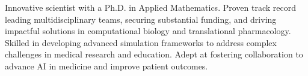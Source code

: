 \par{
Innovative scientist with a Ph.D. in Applied Mathematics. Proven track record leading multidisciplinary teams, securing substantial funding, and driving impactful solutions in computational biology and translational pharmacology. Skilled in developing advanced simulation frameworks to address complex challenges in medical research and education. Adept at fostering collaboration to advance AI in medicine and improve patient outcomes. 
} 